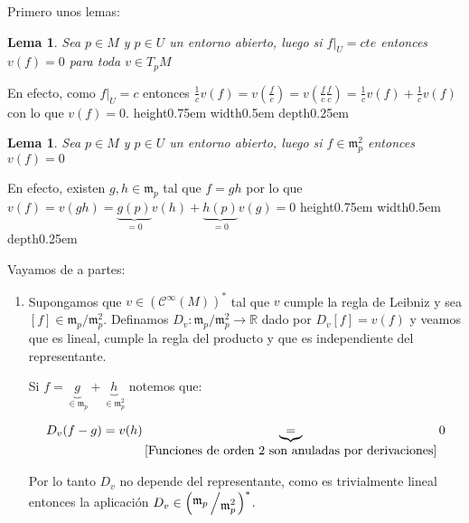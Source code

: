 \documentclass[11pt]{article}
\newcommand{\R}{{\mathbb{R}}}
\newcommand{\dual}[1]{\left(#1\right)^{\ast}}
\newcommand{\quotient}[2]{{\raisebox{.2em}{$#1$}\left/\raisebox{-.2em}{$#2$}\right.}}
\numberwithin{theorem}{subsection}
\newtheorem{lemma}[theorem]{Lema}
\newenvironment{proof}[1][Demostraci\'on]{\begin{trivlist}
		\item[\hskip \labelsep {\bfseries #1}]}{\end{trivlist}}
\newcommand{\qed}{\nobreak \ifvmode \relax \else
	\ifdim\lastskip<1.5em \hskip-\lastskip
	\hskip1.5em plus0em minus0.5em \fi \nobreak
	\vrule height0.75em width0.5em depth0.25em\fi}
\begin{document}
\begin{solution}
	
	Primero unos lemas:
	
	\begin{lemma}
		\label{Constante en un entorno son anuladas por una derivacion}
		Sea $p \in M$ y $p \in U$ un entorno abierto, luego si $f \vert_U = cte$ entonces $v(f) = 0$ para toda $v \in T_pM$
	\end{lemma}
	
	\begin{proof}
		En efecto, como $f \vert_U = c$ entonces $\frac{1}{c} v(f) = v(\frac{f}{c}) = v(\frac{f}{c}\frac{f}{c}) = \frac{1}{c} v(f) + \frac{1}{c} v(f) $ con lo que $v(f) = 0$. \qed
	\end{proof}
	
	\begin{lemma}
		\label{Funciones de orden 2 son anuladas por derivaciones}
		Sea $p \in M$ y $p \in U$ un entorno abierto, luego si $f \in \mathfrak{m}_p^2$ entonces $v(f) = 0$ 
	\end{lemma}
	
	\begin{proof}
		En efecto, existen $g,h \in \mathfrak{m}_p$ tal que $f = gh$ por lo que $v(f) = v(gh) = \underbrace{g(p)}_{=0}v(h) + \underbrace{h(p)}_{=0}v(g) = 0$\qed
	\end{proof}
	
	
	Vayamos de a partes:

		\begin{enumerate}
			\item[$i \Longrightarrow \ ii$] Supongamos que  $v \in \dual{\mathcal{C}^{\infty}(M)}$ tal que $v$ cumple la regla de Leibniz y sea $[f] \in \mathfrak{m}_p/\mathfrak{m}_p^2$. Definamos $D_v: \mathfrak{m}_p/\mathfrak{m}_p^2 \rightarrow \R$ dado por $D_v[f] = v(f)$ y veamos que es lineal, cumple la regla del producto y que es independiente del representante.
			
			Si $f = \underbrace{g}_{\in \mathfrak{m}_p} + \underbrace{h}_{\in \mathfrak{m}_p^2}$ notemos que:
			
			\begin{equation*}
				D_v(f-g) = v (h) \underbrace{=}_{\ref{Funciones de orden 2 son anuladas por derivaciones}} 0
			\end{equation*}
			
			Por lo tanto $D_v$ no depende del representante, como es trivialmente lineal entonces la aplicaci\'on $D_v \in \dual{\quotient{\mathfrak{m}_p}{\mathfrak{m}_p^2}}$.
			

\end{enumerate}
\end{solution}
\end{document}
